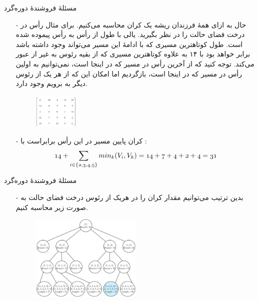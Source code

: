\begin{frame}{مسئلهٔ فروشندهٔ دوره‌گرد}
\begin{itemize}\itemr
\item[-]
حال به ازای همهٔ فرزندان ریشه یک کران محاسبه می‌کنیم.
برای مثال
 رأس
\m{[1,2]}
در درخت فضای حالت را در نظر بگیرید. یالی با طول
از رأس
به رأس
پیموده شده است.
طول کوتاهترین مسیری که با ادامهٔ این مسیر می‌تواند وجود داشته باشد برابر خواهد بود با ۱۴ به علاوه کوتاهترین مسیری که از بقیه رئوس به غیر از 
 عبور می‌کند. توجه کنید که از آخرین رأس در مسیر که در اینجا
است،
نمی‌توانیم به اولین رأس در مسیر که در اینجا
است،
بازگردیم اما امکان این که از هر یک از رئوس دیگر به 
برویم وجود دارد.
\begin{figure}
\includegraphics[width=0.2\textwidth]{figs/chap06/263-tsp-matrix}
\end{figure}
\item[-]
 کران پایین مسیر در این رأس برابراست با :
\begin{align*}
\mathnormal{14 + \sum_{i\in \{2,3,4,5 \}} min_k(V_i,V_k) = 14 + 7 + 4 + 2 + 4 = 31}
\end{align*}
\end{itemize}
\end{frame} 


\begin{frame}{مسئلهٔ فروشندهٔ دوره‌گرد}
\begin{itemize}\itemr
\item[-]
بدین ترتیب می‌توانیم مقدار کران را در هر‌یک از رئوس درخت فضای حالت به صورت زیر محاسبه کنیم.
\begin{figure}
\includegraphics[width=0.5\textwidth]{figs/chap06/267-tree}
\end{figure}
\end{itemize}
\end{frame} 


